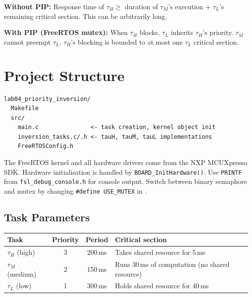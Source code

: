 \documentclass[11pt, a4paper]{article}
\begin{document}
\textbf{Without PIP:}
Response time of $\tau_H \geq$ duration of $\tau_M$'s execution + $\tau_L$'s remaining
critical section. This can be arbitrarily long.

\textbf{With PIP (FreeRTOS mutex):}
When $\tau_H$ blocks, $\tau_L$ inherits $\tau_H$'s priority. $\tau_M$ cannot preempt
$\tau_L$. $\tau_H$'s blocking is bounded to at most one $\tau_L$ critical section.

\section{Project Structure}

\begin{lstlisting}[style=textstyle]
lab04_priority_inversion/
  Makefile
  src/
    main.c               <- task creation, kernel object init
    inversion_tasks.c/.h <- tauH, tauM, tauL implementations
    FreeRTOSConfig.h
\end{lstlisting}

\begin{warnbox}
  The FreeRTOS kernel and all hardware drivers come from the NXP MCUXpresso SDK.
  Hardware initialisation is handled by \texttt{BOARD\_InitHardware()}. Use
  \texttt{PRINTF} from \texttt{fsl\_debug\_console.h} for console output. Switch
  between binary semaphore and mutex by changing \texttt{\#define USE\_MUTEX} in
  .
\end{warnbox}

\subsection{Task Parameters}

\renewcommand{\arraystretch}{1.3}
\begin{tabular}{@{} p{2.5cm} c c p{5cm} @{}}
  \toprule
  \textbf{Task} & \textbf{Priority} & \textbf{Period} & \textbf{Critical section} \\
  \midrule
  $\tau_H$ (high)   & 3 & 200\,ms & Takes shared resource for 5\,ms \\
  $\tau_M$ (medium) & 2 & 150\,ms & Runs 30\,ms of computation (no shared resource) \\
  $\tau_L$ (low)    & 1 & 300\,ms & Holds shared resource for 40\,ms \\
  \bottomrule
\end{tabular}
\renewcommand{\arraystretch}{1}

\end{document}
